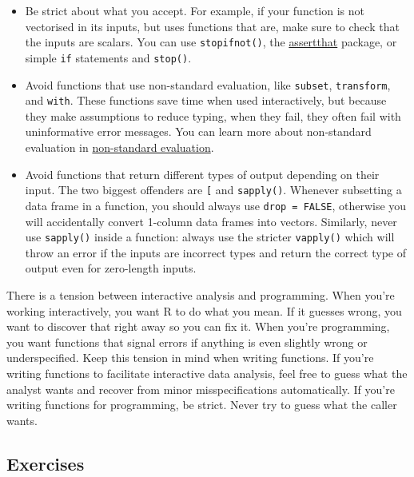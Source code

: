 \begin{itemize}
\item
  Be strict about what you accept. For example, if your function is not
  vectorised in its inputs, but uses functions that are, make sure to
  check that the inputs are scalars. You can use \texttt{stopifnot()},
  the \href{https://github.com/hadley/assertthat}{assertthat} package,
  or simple \texttt{if} statements and \texttt{stop()}.
\item
  Avoid functions that use non-standard evaluation, like
  \texttt{subset}, \texttt{transform}, and \texttt{with}. These
  functions save time when used interactively, but because they make
  assumptions to reduce typing, when they fail, they often fail with
  uninformative error messages. You can learn more about non-standard
  evaluation in \hyperref[nse]{non-standard evaluation}.
\item
  Avoid functions that return different types of output depending on
  their input. The two biggest offenders are \texttt{{[}} and
  \texttt{sapply()}. Whenever subsetting a data frame in a function, you
  should always use \texttt{drop = FALSE}, otherwise you will
  accidentally convert 1-column data frames into vectors. Similarly,
  never use \texttt{sapply()} inside a function: always use the stricter
  \texttt{vapply()} which will throw an error if the inputs are
  incorrect types and return the correct type of output even for
  zero-length inputs.
\end{itemize}

There is a tension between interactive analysis and programming. When
you're working interactively, you want R to do what you mean. If it
guesses wrong, you want to discover that right away so you can fix it.
When you're programming, you want functions that signal errors if
anything is even slightly wrong or underspecified. Keep this tension in
mind when writing functions. If you're writing functions to facilitate
interactive data analysis, feel free to guess what the analyst wants and
recover from minor misspecifications automatically. If you're writing
functions for programming, be strict. Never try to guess what the caller
wants.

\subsection{Exercises}


